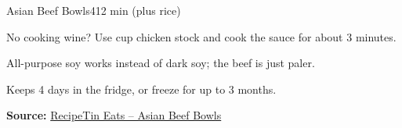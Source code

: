 \begin{recipebox}{Asian Beef Bowls}{4}{12 min (plus rice)}
\begin{notelist}
  \item No cooking wine? Use  cup chicken stock and cook the sauce
        for about 3 minutes.
  \item All-purpose soy works instead of dark soy; the beef is just paler.
  \item Keeps 4 days in the fridge, or freeze for up to 3 months.
\end{notelist}

\noindent\textbf{Source:} \href{https://www.recipetineats.com/asian-beef-bowls/}{RecipeTin Eats -- Asian Beef Bowls}

\end{recipebox}
